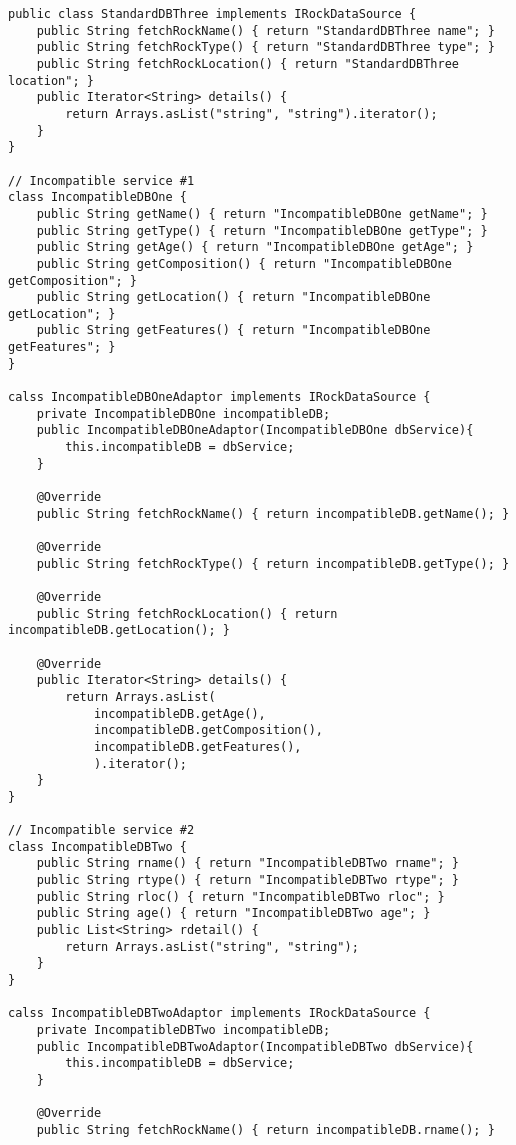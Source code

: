 \begin{enumerate}
\begin{verbatim}
public class StandardDBThree implements IRockDataSource {
    public String fetchRockName() { return "StandardDBThree name"; }
    public String fetchRockType() { return "StandardDBThree type"; }
    public String fetchRockLocation() { return "StandardDBThree location"; }
    public Iterator<String> details() {
        return Arrays.asList("string", "string").iterator();
    }
}

// Incompatible service #1
class IncompatibleDBOne {
    public String getName() { return "IncompatibleDBOne getName"; }
    public String getType() { return "IncompatibleDBOne getType"; }
    public String getAge() { return "IncompatibleDBOne getAge"; }
    public String getComposition() { return "IncompatibleDBOne getComposition"; }
    public String getLocation() { return "IncompatibleDBOne getLocation"; }
    public String getFeatures() { return "IncompatibleDBOne getFeatures"; }
}

calss IncompatibleDBOneAdaptor implements IRockDataSource {
    private IncompatibleDBOne incompatibleDB;
    public IncompatibleDBOneAdaptor(IncompatibleDBOne dbService){
        this.incompatibleDB = dbService;
    }

    @Override
    public String fetchRockName() { return incompatibleDB.getName(); }

    @Override
    public String fetchRockType() { return incompatibleDB.getType(); }

    @Override
    public String fetchRockLocation() { return incompatibleDB.getLocation(); }

    @Override
    public Iterator<String> details() {
        return Arrays.asList(
            incompatibleDB.getAge(), 
            incompatibleDB.getComposition(), 
            incompatibleDB.getFeatures(), 
            ).iterator();
    }
}

// Incompatible service #2
class IncompatibleDBTwo {
    public String rname() { return "IncompatibleDBTwo rname"; }
    public String rtype() { return "IncompatibleDBTwo rtype"; }
    public String rloc() { return "IncompatibleDBTwo rloc"; }
    public String age() { return "IncompatibleDBTwo age"; }
    public List<String> rdetail() {
        return Arrays.asList("string", "string");
    }
}

calss IncompatibleDBTwoAdaptor implements IRockDataSource {
    private IncompatibleDBTwo incompatibleDB;
    public IncompatibleDBTwoAdaptor(IncompatibleDBTwo dbService){
        this.incompatibleDB = dbService;
    }

    @Override
    public String fetchRockName() { return incompatibleDB.rname(); }


\end{verbatim}
\end{enumerate}
